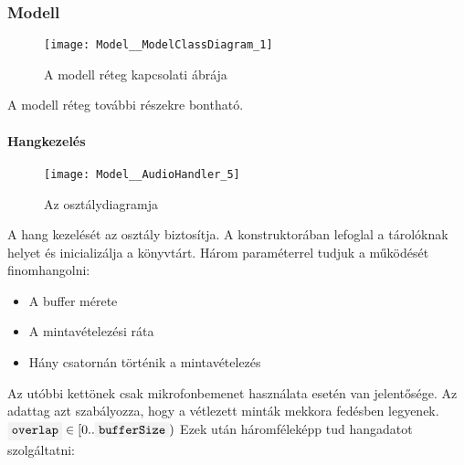 \subsubsection{Modell}
\begin{figure}[h]
	\texttt{[image: Model\_\_ModelClassDiagram\_1]}
	\centering
	\caption{A modell r\'eteg kapcsolati \'abr\'aja}
\end{figure}
A modell r\'eteg tov\'abbi r\'eszekre bonthat\'o.

\paragraph{Hangkezel\'es}\label{audiohandling}
\begin{figure}[h]
	\texttt{[image: Model\_\_AudioHandler\_5]}
	\centering
	\caption{Az  oszt\'alydiagramja}
\end{figure}
A hang kezel\'es\'et az  oszt\'aly biztos\'itja.
A konstruktor\'aban lefoglal a t\'arol\'oknak helyet \'es inicializ\'alja a  k\"onyvt\'art.
H\'arom param\'eterrel tudjuk a m\H uk\"od\'es\'et finomhangolni:
\begin{itemize}
	\item A buffer m\'erete
	\item A mintav\'etelez\'esi r\'ata
	\item H\'any csatorn\'an t\"ort\'enik a mintav\'etelez\'es
\end{itemize}
Az ut\'obbi kett\"onek csak mikrofonbemenet haszn\'alata eset\'en van jelent\H os\'ege.
Az  adattag azt szab\'alyozza, hogy a v\'etlezett mint\'ak mekkora fed\'esben legyenek. $\code{overlap}\in[0..\code{bufferSize})$
\newline
Ezek ut\'an h\'aromf\'elek\'epp tud hangadatot szolg\'altatni:
